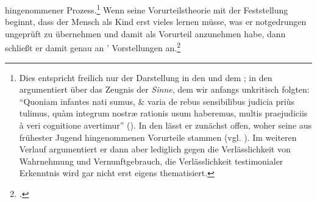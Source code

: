 hingenommener Prozess.\footnote{Dies entspricht freilich nur der Darstellung in
den  und dem ; in den  argumentiert
 über das Zeugnis der
\emph{Sinne}, dem wir anfangs unkritisch folgten: \enquote{Quoniam infantes nati sumus, {\&}
varia de rebus sensibilibus judicia pri{\`u}s tulimus, qu{\`a}m integrum
nostr{\ae} rationis usum haberemus, multis praejudiciis {\`a} veri cognitione
avertimur} \mkbibparens{\cite[][VIII:
5.5--8]{Descartes:OeuvresdeDescartes1983}}. In
den  lässt er zunächst offen, woher seine aus frühester
Jugend hingenommenen Vorurteile stammen \mkbibparens{vgl.
\cite[][VII: 17.2--10]{Descartes:OeuvresdeDescartes1983}}. Im weiteren Verlauf
argumentiert er dann aber lediglich gegen die Verlässlichkeit von Wahrnehmung
und Vernunftgebrauch, die Verlässlichkeit testimonialer Erkenntnis wird gar
nicht erst eigens thematisiert.} Wenn
seine Vorurteilstheorie mit der Feststellung beginnt, dass der Mensch als Kind
erst vieles lernen müsse, was er notgedrungen ungeprüft zu übernehmen und damit
als Vorurteil anzunehmen habe, dann schließt er damit genau an
' Vorstellungen
an.\footnote{\cite[Vgl.][104]{Schneiders:AufklaerungundVorurteilskritik1983}.}


